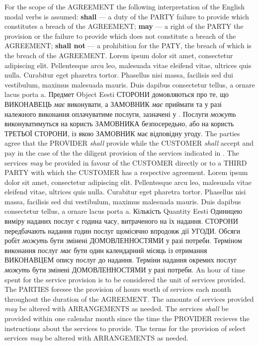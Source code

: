 \begin{Form}
\begin{paracol}{3}
        {For the scope of the AGREEMENT the following interpretation of the English modal verbs is assumed: \textbf{shall} — a duty of the PARTY failure to provide which constitutes a breach of the AGREEMENT; \textbf{may} — a right of the PARTY the provision or the failure to provide which does not constitute a breach of the AGREEMENT; \textbf{shall not} — a prohibition for the PATY, the breach of which is the breach of the AGREEMENT.}
        {Lorem ipsum dolor sit amet, consectetur adipiscing elit. Pellentesque arcu leo, malesuada vitae eleifend vitae, ultrices quis nulla. Curabitur eget pharetra tortor. Phasellus nisi massa, facilisis sed dui vestibulum, maximus malesuada mauris. Duis dapibus consectetur tellus, a ornare lacus porta a.}
      \clause
        {Предмет}
        {Object}
        {Eesti}
        {СТОРОНИ домовляються про те, що ВИКОНАВЕЦЬ \textit{має} виконувати, а ЗАМОВНИК \textit{має} приймати та у разі належного виконання оплачуватиме послуги, зазначені у . Послуги \textit{можуть} виконуватимуться на користь ЗАМОВНИКА безпосередьно, або на користь ТРЕТЬОЇ СТОРОНИ, із якою ЗАМОВНИК має відповідну угоду.}
        {The parties agree that the PROVIDER \textit{shall} provide while the CUSTOMER \textit{shall} accept and pay in the case of the the diligent provision of the services indicated in . The services \textit{may} be provided in favour of the CUSTOMER directly or to a THIRD PARTY with which the CUSTOMER has a respective agreement.}
        {Lorem ipsum dolor sit amet, consectetur adipiscing elit. Pellentesque arcu leo, malesuada vitae eleifend vitae, ultrices quis nulla. Curabitur eget pharetra tortor. Phasellus nisi massa, facilisis sed dui vestibulum, maximus malesuada mauris. Duis dapibus consectetur tellus, a ornare lacus porta a.}
      \clause
        {Кількість}
        {Quantity}
        {Eesti}
        {Одиницею виміру наданих послуг є година часу, витраченого на їх надання. СТОРОНИ передбачають надання  годин послуг щомісячно впродовж дії УГОДИ. Обсяги робіт \textit{можуть} бути змінені ДОМОВЛЕННОСТЯМИ у разі потреби. Терміном виконання послуг \textit{має} бути один календарний місяць із отримання ВИКОНАВЦЕМ опису послуг до надання. Терміни надання окремих послуг \textit{можуть} бути змінені ДОМОВЛЕННОСТЯМИ у разі потреби.}
        {An hour of time spent for the service provision is to be considered the unit of services provided. The PARTIES foresee the provision of  hours worth of services each month throughout the duration of the AGREEMENT. The amounts of services provided \textit{may} be altered with ARRANGEMENTS as needed. The services \textit{shall} be provided within one calendar month since the time the PROVIDER recieves the instructions about the services to provide. The terms for the provision of select services \textit{may} be altered with ARRANGEMENTS as needed.}

\end{paracol}
\end{Form}
